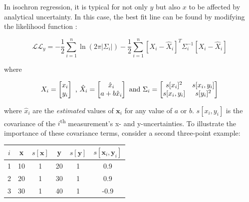 \begin{refsection}
In isochron regression, it is typical for not only $y$ but also $x$ to
be affected by analytical uncertainty. In this case, the best fit line
can be found by modifying the likelihood function
\citep{titterington1979, york1969, york2004}:

\begin{equation}
  \mathcal{LL}_y = 
  -\frac{1}{2} \sum\limits_{i=1}^{n}
  \ln\left(2 \pi |\Sigma_i| \right)
  -\frac{1}{2} \sum\limits_{i=1}^{n}
  \left[X_i-\hat{X}_i\right]^T
  \Sigma_i^{-1}
  \left[X_i-\hat{X}_i\right]
  \label{eq:Ly}
\end{equation}

\noindent where

\begin{equation}
  X_i = \left[
    \begin{array}{@{}c@{}}
      x_i\\
      y_i\\
    \end{array}
    \right]
  \mbox{~,~}
  \hat{X}_i = \left[
    \begin{array}{@{}c@{}}
      \hat{x}_i \\
      a + b \hat{x}_i
    \end{array}
    \right]
  \mbox{~and~}
  \Sigma_i = \left[
    \begin{array}{@{}cc@{}}
      s[x_i]^2 & s[x_i,y_i] \\
      s[x_i,y_i] & s[y_i]^2
    \end{array}
    \right]
\end{equation}

\noindent where $\hat{x}_i$ are the \emph{estimated} values of
$\mathbf{x}_i$ for any value of $a$ or $b$. $s[x_i,y_i]$ is the
covariance of the $i$\textsuperscript{th} measurement's x- and
y-uncertainties. To illustrate the importance of these covariance
terms, consider a second three-point example:

\begin{center}
\begin{tabular}{cccccc}
  $i$ & \textbf{x} & $s[\boldsymbol{x}]$ & \textbf{y} &
  $s[\boldsymbol{y}]$ & $s[\boldsymbol{x}_i,\boldsymbol{y}_i]$ \\
  \hline
  1 & 10 & 1 & 20 & 1 & 0.9 \\
  2 & 20 & 1 & 30 & 1 & 0.9 \\
  3 & 30 & 1 & 40 & 1 & -0.9
\end{tabular}
\end{center}


\end{refsection}
